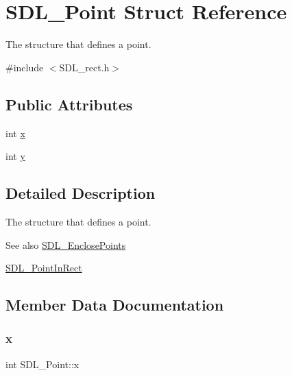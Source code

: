 \hypertarget{struct_s_d_l___point}{}\section{S\+D\+L\+\_\+\+Point Struct Reference}
\label{struct_s_d_l___point}


The structure that defines a point.  




{\ttfamily \#include $<$S\+D\+L\+\_\+rect.\+h$>$}

\subsection*{Public Attributes}
\begin{DoxyCompactItemize}
\item 
int \mbox{\hyperlink{struct_s_d_l___point_a2ee987d59888024771c8d83aec43056c}{x}}
\item 
int \mbox{\hyperlink{struct_s_d_l___point_aaa68aefa869f6bdf46367a70bd9414b0}{y}}
\end{DoxyCompactItemize}


\subsection{Detailed Description}
The structure that defines a point. 

\begin{DoxySeeAlso}{See also}
\mbox{\hyperlink{_s_d_l__rect_8h_afcbb58dbba760b9e6fdb4b5d1ece015c}{S\+D\+L\+\_\+\+Enclose\+Points}} 

\mbox{\hyperlink{_s_d_l__rect_8h_a2f9708f2739ef234c34e6feda50b4d2c}{S\+D\+L\+\_\+\+Point\+In\+Rect}} 
\end{DoxySeeAlso}


\subsection{Member Data Documentation}
\mbox{\label{struct_s_d_l___point_a2ee987d59888024771c8d83aec43056c}} 
\subsubsection{\texorpdfstring{x}{x}}
{\footnotesize\ttfamily int S\+D\+L\+\_\+\+Point\+::x}

